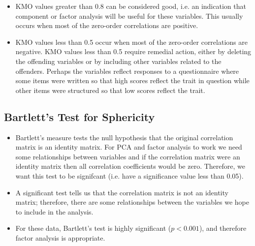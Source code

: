 \documentclass[a4paper,12pt]{article}
\begin{document}
\begin{itemize}
\item KMO values greater than 0.8 can be considered good, i.e. an indication that component or factor analysis will be useful for these variables. This usually occurs when most of the zero-order correlations are positive. 
\item KMO values less than 0.5 occur when most of the zero-order correlations are negative. KMO values less than 0.5 require remedial action, either by deleting the offending variables or by including other variables related to the offenders. Perhaps the variables reflect responses to a questionnaire where some items were written so that high scores reflect the trait in question while other items were structured so that low scores reflect the trait. 
\end{itemize}


\subsection{Bartlett's Test for Sphericity}
\begin{itemize}
	\item
Bartlett's measure tests the null hypothesis that the original correlation matrix is an identity
matrix. For PCA and factor analysis to work we need some relationships between variables and if the correlation
matrix were an identity matrix then all correlation coefficients would be zero. Therefore, we
want this test to be signifcant (i.e. have a significance value less than 0.05). 
\item A significant test
tells us that the correlation matrix is not an identity matrix; therefore, there are some relationships
between the variables we hope to include in the analysis. 
\item For these data, Bartlett's test is
highly significant ($p < 0.001$), and therefore factor analysis is appropriate.
\end{itemize}
\end{document}
